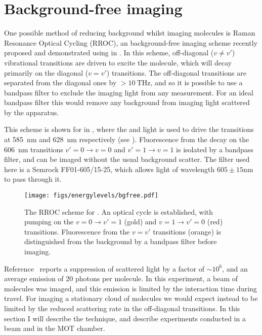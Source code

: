 \section{Background-free imaging}
\label{exper:bgf}

One possible method of reducing background whilst imaging molecules is Raman
Resonance Optical Cycling (RROC), an background-free imaging scheme recently
proposed and demonstrated using \SrF{} in . In this scheme,
off-diagonal ($v\neq v'$) vibrational transitions are driven to excite the
molecule, which will decay primarily on the diagonal ($v=v'$) transitions. The
off-diagonal transitions are separated from the diagonal ones by
$>\SI{10}{\tera\hertz}$, and so it is possible to use a bandpass filter to
exclude the imaging light from any measurement. For an ideal bandpass filter
this would remove any background from imaging light scattered by the apparatus.

This scheme is shown for \CaF{} in , where
the  and  light is used to drive the transitions at
\SI{585}{\nano\meter} and \SI{628}{\nano\meter} respectively (see
). Fluorescence from the decay on the
\SI{606}{\nano\meter} transitions $v'=0\rightarrow v=0$ and $v'=1\rightarrow
v=1$ is isolated by a bandpass filter, and can be imaged without the usual
background scatter. The filter used here is a Semrock FF01-605/15-25, which
allows light of wavelength $605\pm{15}\si{\nano\meter}$ to pass through it.

\begin{figure}[b]
  \centering
  \texttt{[image: figs/energylevels/bgfree.pdf]}
  \caption[The RROC scheme for \CaF{}]{
  The RROC scheme for \CaF{}. An optical cycle is established, with pumping on
  the $v=0 \rightarrow v'=1$ (gold) and $v=1 \rightarrow v'=0$ (red) transitions.
  Fluorescence from the $v=v'$ transitions (orange) is distinguished from the
  background by a bandpass filter before imaging.
  }
  \label{exper:fig:bgfreelevels}
\end{figure}

Reference~\cite{Shaw2021} reports a suppression of scattered light by a factor
of $\sim10^6$, and an average emission of 20 photons per molecule. In this
experiment, a beam of molecules was imaged, and this emission is limited by the
interaction time during travel. For imaging a stationary cloud of molecules we
would expect instead to be limited by the reduced scattering rate in the
off-diagonal transitions. In this section I will describe the technique, and
describe experiments conducted in a beam and in the MOT chamber.

